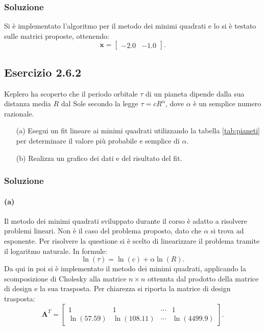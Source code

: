 \documentclass[letterpaper, 12pt]{article}
\numberwithin{equation}{section}    %
\begin{document}
\subsubsection{Soluzione}
Si è implementato l'algoritmo per il metodo dei minimi quadrati e lo si è testato sulle matrici proposte, 
ottenendo:
\begin{equation*}
    \mathbf{x} = \begin{bmatrix}
        -2.0 & -1.0
    \end{bmatrix}.
\end{equation*}

\subsection{Esercizio 2.6.2}
Keplero ha scoperto che il periodo orbitale $\tau$ di un pianeta dipende dalla sua distanza media $R$ dal Sole 
secondo la legge $\tau = c R^{\alpha}$, dove $\alpha$ è un semplice numero razionale. \\
\begin{enumerate}[label=(\alph*)]
    \item[(a)] Esegui un fit lineare ai minimi quadrati utilizzando la tabella \ref{tab:pianeti} per determinare il valore 
    più probabile e semplice di $\alpha$. 
    \item[(b)] Realizza un grafico dei dati e del risultato del fit.
\end{enumerate}

\subsubsection{Soluzione}
\paragraph{(a)}Il metodo dei minimi quadrati sviluppato durante il corso è adatto a risolvere
problemi lineari.
Non è il caso del problema proposto, dato che $\alpha$ si trova ad esponente. Per risolvere la questione si 
è scelto di linearizzare il problema tramite il logaritmo naturale. In formule:
\begin{equation}
    \ln(\tau) = \ln(c) + \alpha \ln(R).
\end{equation}
Da qui in poi si è implementato il metodo dei minimi quadrati, applicando la scomposizione di Cholesky alla 
matrice $n \times n$ ottenuta dal prodotto della matrice di design e la sua trasposta. Per chiarezza si riporta
la matrice di design trasposta:
\begin{equation*}
    \mathbf{A}^T = \begin{bmatrix}
        1 & 1 & \cdots & 1 \\
        \ln(57.59) & \ln(108.11) & \cdots & \ln(4499.9)
    \end{bmatrix}.
\end{equation*}
\end{document}
